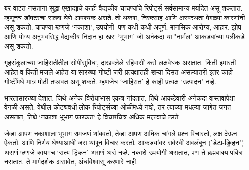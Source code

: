 बरं वाटत नसताना सुद्धा  एखाद्याचे काही वैद्यकीय चाचण्यांचे रिपोर्ट्स सर्वसामान्य मर्यादेत असू शकतात. म्हणूनच डॉक्टरचा सल्ला घेणे आवश्यक असते. तो थकवा, निरुत्साह आणि अस्वस्थता वेगळ्या कारणांनी असू शकतो. चाचण्या म्हणजे ‘नकाशा’, उपयोगी, पण कधी कधी अपूर्ण. मानसिक आरोग्य, आहार, झोप आणि योग्य अनुभवसिद्ध वैद्यकीय निदान हा खरा ‘भूभाग’ जो  अनेकदा या "नॉर्मल" आकड्यांच्या पलीकडे असू शकतो.

गृहसंकुलाच्या जाहिरातीतील सोयीसुविधा, दाखवलेले रहिवासी कसे लक्षवेधक असतात. किती इमारती आहेत व किती मजले आहेत या सारख्या गोष्टी जरी प्रत्यक्षातही खऱ्या दिसत असल्यातरी इतर काही गोष्टींमधे मात्र मोठी तफावत असू शकते. म्हणजेच ‘जाहिरात’ हे काही प्रत्यक्ष ‘उत्पादन’ नव्हे. 

भारतासारख्या देशात, जिथे अनेक विरोधाभास एकत्र नांदतात, तिथे आकडेवारी अनेकदा वास्तवापेक्षा वेगळी असते. येथील कोट्यवधी लोक रिपोर्ट्सच्या ओळींमध्ये नव्हे, तर त्याच्या मधल्या जागेत जगत असतात, तिथे ‘नकाशा-भूभाग-फारकत’ हे विचारचित्र अधिक महत्त्वाचे ठरते.

जेव्हा आपण नकाशाला भूभाग समजणं थांबवतो, तेव्हा आपण अधिक चांगले प्रश्न विचारतो, लक्ष देऊन ऐकतो, आणि निर्णय घेण्याआधी जरा थांबून विचार करतो. आकड्यांवर सर्वस्वी अवलंबून ('डेटा-ड्रिव्हन') असणं म्हणजे कायमच ‘सत्य-ड्रिव्हन' असणं असे नव्हे. नकाशे उपयोगी असतात, पण ते ब्रह्मवाक्य-पवित्र नसतात. ते मार्गदर्शक असावेत, अंधविश्वासू करणारे नाही.

